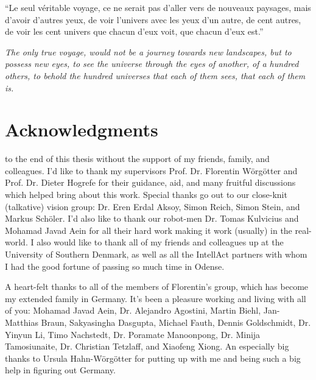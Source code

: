 \begin{savequote}[75mm]
\onehalfspacing
\textnormal{``Le seul v\'{e}ritable voyage, ce ne serait pas d'aller vers de nouveaux paysages, mais d'avoir d'autres yeux, de voir l'univers avec les yeux d'un autre, de cent autres, de voir les cent univers que chacun d'eux voit, que chacun d'eux est.''} 

\vspace{16pt} 

\textit{The only true voyage, would not be a journey towards new landscapes, but to possess new eyes, to see the universe through the eyes of another, of a hundred others, to behold the hundred universes that each of them sees, that each of them is.}
\end{savequote}

\chapter*{Acknowledgments}
\vspace{10mm}
 to the end of this thesis without the support of my friends, family, and colleagues. I'd like to thank my supervisors Prof. Dr. Florentin W\"org\"otter and Prof. Dr. Dieter Hogrefe for their guidance, aid, and many fruitful discussions which helped bring about this work. Special thanks go out to our close-knit (talkative) vision group: Dr. Eren Erdal Aksoy, Simon Reich, Simon Stein, and Markus Sch\"oler. I'd also like to thank our robot-men Dr. Tomas Kulvicius and Mohamad Javad Aein for all their hard work making it work (usually) in the real-world. I also would like to thank all of my friends and colleagues up at the University of Southern Denmark, as well as all the IntellAct partners with whom I had the good fortune of passing so much time in Odense. 

A heart-felt thanks to all of the members of Florentin's group, which has become my extended family in Germany. It's been a pleasure working and living with all of you: Mohamad Javad Aein, Dr. Alejandro Agostini, Martin Biehl, Jan-Matthias Braun, Sakyasingha Dasgupta, Michael Fauth, Dennis Goldschmidt, Dr. Yinyun Li, Timo Nachstedt, Dr. Poramate Manoonpong, Dr. Minija Tamosiunaite, Dr. Christian Tetzlaff, and Xiaofeng Xiong. An especially big thanks to Ursula Hahn-W\"org\"otter for putting up with me and being such a big help in figuring out Germany.

